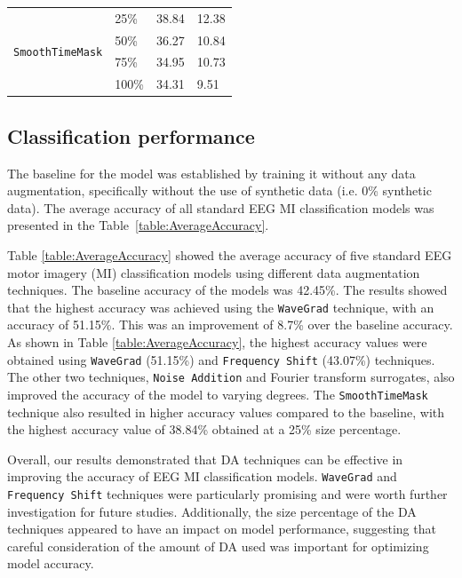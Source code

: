 \begin{table}[ht!]
\begin{tabular}{llll}
        \hline
        \multirow{4}{*}{\texttt{SmoothTimeMask}}  & 25\%      & 38.84    & 12.38                 \\
                                        & 50\%      & 36.27    & 10.84                 \\
                                        & 75\%      & 34.95    & 10.73                 \\
                                        & 100\%     & 34.31    & 9.51                  \\
        \hline
        \end{tabular}
\end{table}


\subsection{Classification performance}
The baseline for the model was established by training it without any data augmentation, specifically without the use of synthetic data (i.e. 0\% synthetic data). 
The average accuracy of all standard EEG MI classification models was presented in the Table~\ref{table:AverageAccuracy}. 

Table \ref{table:AverageAccuracy} showed the average accuracy of five standard EEG motor imagery (MI) classification models using different data augmentation techniques.
The baseline accuracy of the models was 42.45\%.
The results showed that the highest accuracy was achieved using the \texttt{WaveGrad} technique, with an accuracy of 51.15\%.
This was an improvement of 8.7\% over the baseline accuracy.
As shown in Table \ref{table:AverageAccuracy}, the highest accuracy values were obtained using \texttt{WaveGrad} (51.15\%) and \texttt{Frequency Shift} (43.07\%) techniques.
The other two techniques, \texttt{Noise Addition} and Fourier transform surrogates, also improved the accuracy of the model to varying degrees. 
The \texttt{\texttt{SmoothTimeMask}} technique also resulted in higher accuracy values compared to the baseline, with the highest accuracy value of 38.84\% obtained at a 25\% size percentage.

Overall, our results demonstrated that DA techniques can be effective in improving the accuracy of EEG MI classification models.
\texttt{WaveGrad} and \texttt{Frequency Shift} techniques were particularly promising and were worth further investigation for future studies.
Additionally, the size percentage of the DA techniques appeared to have an impact on model performance, suggesting that careful consideration of the amount of DA used was important for optimizing model accuracy. 

